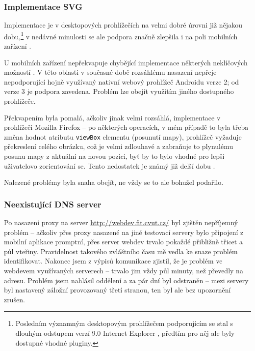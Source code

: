 \subsubsection{Implementace SVG}
Implementace  je v desktopových prohlížečích na velmi dobré úrovni již nějakou dobu,\footnote{Posledním významným desktopovým prohlížečem podporujícím  se stal s dlouhým odstupem verzí 9.0 Internet Explorer \cite{CanIUse}, předtím pro něj ale byly dostupné vhodné pluginy.} v nedávné minulosti se ale podpora značně zlepšila i na poli mobilních zařízení \cite{CanIUse}.

U mobilních zařízení nepřekvapuje chybějící implementace některých neklíčových možností . V této oblasti v současné době rozsáhlému nasazení nepřeje  nepodporující hojně využívaný nativní webový prohlížeč Androidu verze 2; od verze 3 je podpora zavedena. Problém lze obejít využitím jiného dostupného prohlížeče.

Překvapením byla pomalá, ačkoliv jinak velmi rozsáhlá, implementace  v prohlížeči Mozilla Firefox -- po některých operacích, v mém případě to byla třeba změna hodnot atributu \texttt{viewBox}  elementu (posunutí mapy), prohlížeč vyžaduje překreslení celého obrázku, což je velmi zdlouhavé a zabraňuje to plynulému posunu mapy z aktuální na novou pozici, byť by to bylo vhodné pro lepší uživatelovo zorientování se. Tento nedostatek je známý již delší dobu \cite{Bugzilla}.

Nalezené problémy byla snaha obejít, ne vždy se to ale bohužel podařilo.


\subsubsection{Neexistující DNS server}
Po nasazení proxy na server \url{http://webdev.fit.cvut.cz/} byl zjištěn nepříjemný problém -- ačkoliv přes proxy nasazené na jiné testovací servery bylo připojení z mobilní aplikace promptní, přes server webdev trvalo pokaždé přibližně třicet a půl vteřiny. Pravidelnost takového zvláštního času mě vedla ke snaze problém identifikovat. Nakonec jsem z výpisů komunikace zjistil, že je problém ve webdevem využívaných  serverech -- trvalo jim vždy půl minuty, než převedly  na  adresu. Problém jsem nahlásil  oddělení  a za pár dní byl odstraněn -- mezi  servery byl nastavený záložní provozovaný třetí stranou, ten byl ale bez upozornění zrušen.


